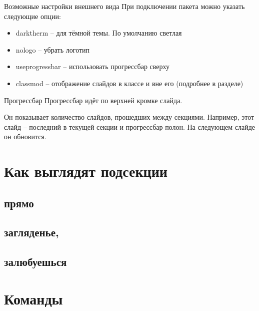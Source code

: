 \documentclass[12pt, aspectratio=43]{beamer}
\begin{document}
    \begin{frame}{Возможные настройки внешнего вида}\relax
        При подключении пакета можно указать следующие опции:
        \begin{itemize}
            \item darktherm -- для тёмной темы. По умолчанию светлая
            \item nologo -- убрать логотип 
            \item useprogressbar -- использовать прогрессбар сверху
            \item classmod -- отображение слайдов в классе и вне его (подробнее в разделе)
             
        \end{itemize}
    \end{frame}

    \begin{frame}{Прогрессбар}\relax
        Прогрессбар идёт по верхней кромке слайда. 
        
        Он показывает количество слайдов, прошедших между секциями.
        Например, этот слайд -- последний в текущей секции и прогрессбар полон. На следующем слайде он обновится.
    \end{frame}
    \section{Как выглядят подсекции}
    \subsection{прямо}
    \subsection{загляденье,}
    \subsection{залюбуешься}
    
    \section{Команды}
\end{document}

